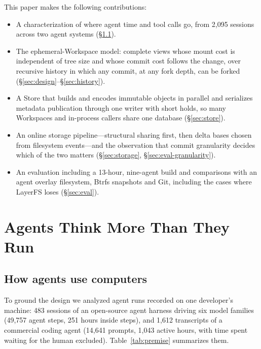 \documentclass[letterpaper,twocolumn,10pt]{article}
\newcommand{\sys}{LayerFS}
\newcommand{\ws}{Workspace}
\begin{document}
This paper makes the following contributions:
\begin{itemize}
\item A characterization of where agent time and tool calls go, from 2,095
  sessions across two agent systems (\S\ref{sec:premise}).
\item The ephemeral-\ws{} model: complete views whose mount cost is
  independent of tree size and whose commit cost follows the change, over
  recursive history in which any commit, at any fork depth, can be forked
  (\S\ref{sec:design}--\S\ref{sec:history}).
\item A Store that builds and encodes immutable objects in parallel and
  serializes metadata publication through one writer with short holds, so many \ws{}s and in-process
  callers share one database (\S\ref{sec:store}).
\item An online storage pipeline---structural sharing first, then delta
  bases chosen from filesystem events---and the observation that commit
  granularity decides which of the two matters (\S\ref{sec:storage},
  \S\ref{sec:eval-granularity}).
\item An evaluation including a 13-hour, nine-agent build and comparisons
  with an agent overlay filesystem, Btrfs snapshots and Git, including the
  cases where \sys{} loses (\S\ref{sec:eval}).
\end{itemize}

\section{Agents Think More Than They Run}
\label{sec:motivation}

\subsection{How agents use computers}
\label{sec:premise}

To ground the design we analyzed agent runs recorded on one developer's
machine: 483 sessions of an open-source agent harness driving six model
families (49,757 agent steps, 251 hours inside steps), and 1,612 transcripts
of a commercial coding agent (14,641 prompts, 1,043 active hours, with time
spent waiting for the human excluded). Table~\ref{tab:premise} summarizes
them.
\end{document}
